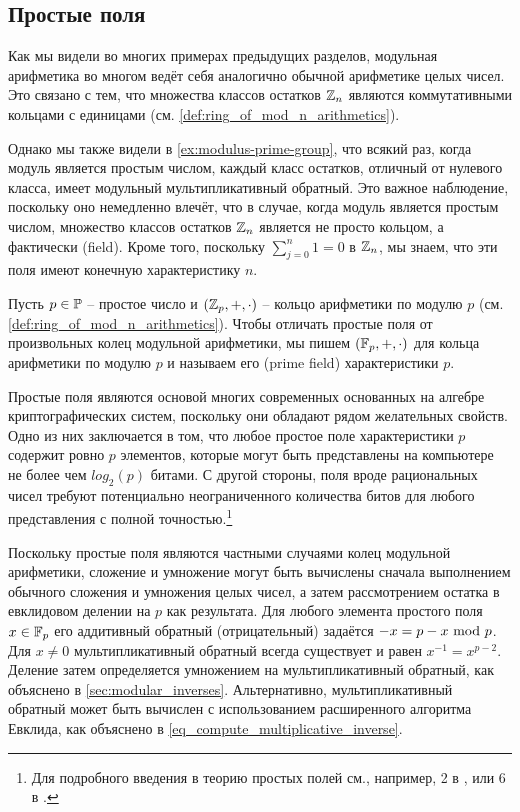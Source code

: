 \subsection{Простые поля}
\label{prime_fields}
Как мы видели во многих примерах предыдущих разделов, модульная арифметика во многом ведёт себя аналогично обычной арифметике целых чисел. Это связано с тем, что множества классов остатков $\mathbb{Z}_n$ являются коммутативными кольцами с единицами (см. \examplename{} \ref{def:ring_of_mod_n_arithmetics}).

Однако мы также видели в \examplename{} \ref{ex:modulus-prime-group}, что всякий раз, когда модуль является простым числом, каждый класс остатков, отличный от нулевого класса, имеет модульный мультипликативный обратный. Это важное наблюдение, поскольку оно немедленно влечёт, что в случае, когда модуль является простым числом, множество классов остатков $\mathbb{Z}_n$ является не просто кольцом, а фактически  (field). Кроме того, поскольку $\sum_{j=0}^n 1 = 0$ в $\mathbb{Z}_n$, мы знаем, что эти поля имеют конечную характеристику $n$.

\begin{notation}
\label{def:prime_fields}
Пусть $p \in \mathbb{P}$ -- простое число и $(\mathbb{Z}_p,+,\cdot)$ -- кольцо арифметики по модулю $p$ (см. \examplename{} \ref{def:ring_of_mod_n_arithmetics}). Чтобы отличать простые поля от произвольных колец модульной арифметики, мы пишем $ (\mathbb{F}_p, +, \cdot) $ для кольца арифметики по модулю $p$ и называем его  (prime field) характеристики $p$.
\end{notation}

Простые поля являются основой многих современных основанных на алгебре криптографических систем, поскольку они обладают рядом желательных свойств. Одно из них заключается в том, что любое простое поле характеристики $p$ содержит ровно $p$ элементов, которые могут быть представлены на компьютере не более чем $log_2(p)$ битами. С другой стороны, поля вроде рациональных чисел требуют потенциально неограниченного количества битов для любого представления с полной точностью.\footnote{Для подробного введения в теорию простых полей см., например, \chaptname{} 2 в \cite{nieder-1986}, или \chaptname{} 6 в \cite{mignotte-1992}.}

Поскольку простые поля являются частными случаями колец модульной арифметики, сложение и умножение могут быть вычислены сначала выполнением обычного сложения и умножения целых чисел, а затем рассмотрением остатка в евклидовом делении на $p$ как результата. Для любого элемента простого поля $x\in \mathbb{F}_p$ его аддитивный обратный (отрицательный) задаётся $-x=p-x \text{ mod } p$. Для $x\neq 0$ мультипликативный обратный всегда существует и равен $x^{-1}=x^{p-2}$. Деление затем определяется умножением на мультипликативный обратный, как объяснено в \secname{} \ref{sec:modular_inverses}. Альтернативно, мультипликативный обратный может быть вычислен с использованием расширенного алгоритма Евклида, как объяснено в \eqref{eq_compute_multiplicative_inverse}.

